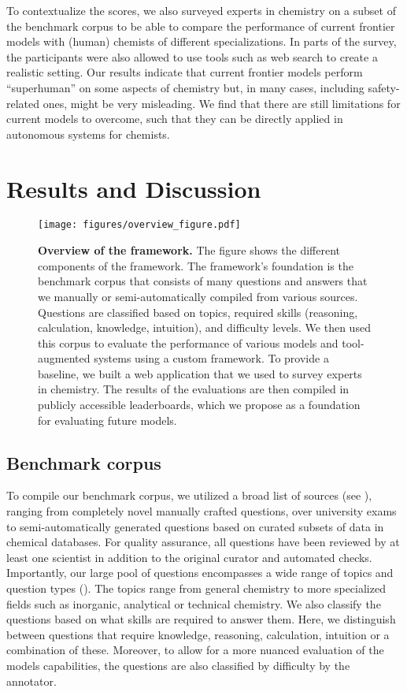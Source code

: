 \documentclass[11pt, oneside]{article}
\begin{document}
\begin{refsection}
To contextualize the scores, we also surveyed  experts in chemistry on a subset of the benchmark corpus to be able to compare the performance of current frontier models with (human) chemists of different specializations. In parts of the survey, the participants were also allowed to use tools such as web search to create a realistic setting.
Our results indicate that current frontier models perform \enquote{superhuman} on some aspects of chemistry but, in many cases, including safety-related ones, might be very misleading.
We find that there are still limitations for current models to overcome, such that they can be directly applied in autonomous systems for chemists.

\section{Results and Discussion}

\begin{figure}
    \texttt{[image: figures/overview\_figure.pdf]}
    \caption{\textbf{Overview of the \chembench framework.} The figure shows the different components of the \chembench framework.
    The framework's foundation is the benchmark corpus that consists of many questions and answers that we manually or semi-automatically compiled from various sources.
    Questions are classified based on topics, required skills (reasoning, calculation, knowledge, intuition), and difficulty levels.
    We then used this corpus to evaluate the performance of various models and tool-augmented systems using a custom framework. To provide a baseline, we built a web application that we used to survey experts in chemistry.
    The results of the evaluations are then compiled in publicly accessible leaderboards, which we propose as a foundation for evaluating future models.
    }
    \label{fig:overview_figure}
\end{figure}

\subsection{Benchmark corpus}

To compile our benchmark corpus, we utilized a broad list of sources (see ), ranging from completely novel manually crafted questions, over university exams to semi-automatically generated questions based on curated subsets of data in chemical databases.
For quality assurance, all questions have been reviewed by at least one scientist in addition to the original curator and automated checks.
Importantly, our large pool of questions encompasses a wide range of topics and question types (). The topics range from general chemistry to more specialized fields such as inorganic, analytical or technical chemistry.
We also classify the questions based on what skills are required to answer them. Here, we distinguish between questions that require knowledge, reasoning, calculation, intuition or a combination of these.
Moreover, to allow for a more nuanced evaluation of the models capabilities, the questions are also classified by difficulty by the annotator.


\end{refsection}
\end{document}
